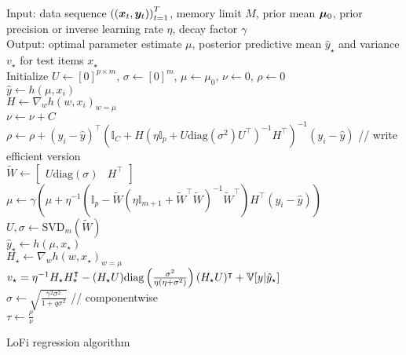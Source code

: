 \begin{algorithm}
Input: data sequence $\left(\left({\bm{x}}_{t},{\bm{y}}_{t}\right)\right)_{t=1}^{T}$,
memory limit $M$, prior mean $\boldsymbol{\mu}_{0}$, prior precision or inverse learning rate $\eta$, decay factor $\gamma$ \\
Output:  optimal parameter estimate $\mu$, posterior predictive mean $\hat{y}_\star$ and variance $v_\star$ for test items $x_\star$ \\
Initialize $U\leftarrow\left[0\right]^{p\times m}$, $\sigma\leftarrow\left[0\right]^{m}$,
$\mu\leftarrow\mu_{0}$, $\nu\leftarrow0$, $\rho\leftarrow0$ \\
 {
$\hat{y}\leftarrow h\left(\mu,x_{i}\right)$ \\
$H\leftarrow\nabla_{w}h\left(w,x_{i}\right)_{w=\mu}$ \\
$\nu\leftarrow\nu+C$ \\
$\rho\leftarrow\rho+(y_i-\hat{y})^{\top}(\mathbb{I}_C+H\left(\eta\mathbb{I}_{p}+U\text{diag}(\sigma^2)U^{\top}\right)^{-1}H^{\top})^{-1}(y_i-\hat{y})$ // write efficient version\\
$\tilde{W}\leftarrow\left[\begin{array}{cc}U\text{diag}(\sigma) & H^{\top}\end{array}\right]$ \\
$\mu\leftarrow\gamma\left(\mu+\eta^{-1}\left(\mathbb{I}_{p}-\tilde{W}\left(\eta\mathbb{I}_{m+1}+\tilde{W}^{\top}\tilde{W}\right)^{-1}\tilde{W}^{\top}\right)H^{\top}\left(y_{i}-\hat{y}\right)\right)$ \\
$U,\sigma\leftarrow{\mathrm{SVD}}_m(\tilde{W})$ \\
 {
$\hat{y}_\star \leftarrow h(\mu,x_\star)$ \\
$H_\star\leftarrow\nabla_{w}h\left(w,x_\star\right)_{w=\mu}$ \\
$v_\star = \eta^{-1}H_\star H_\star^\intercal - (H_\star U) \mathrm{diag}\left(\frac{\sigma^2}{\eta(\eta+\sigma^2)}\right) (H_\star U)^\intercal + \mathbb{V}[y|\hat{y}_\star]$\\
}
$\sigma\leftarrow\sqrt{\frac{\gamma^{2}\sigma^{2}}{1+q\sigma^{2}}}$ // componentwise \\
}
$\tau\leftarrow\frac{\rho}{\nu}$
\caption{\label{alg:LoFi-full-SVD}LoFi regression algorithm}
\end{algorithm}

